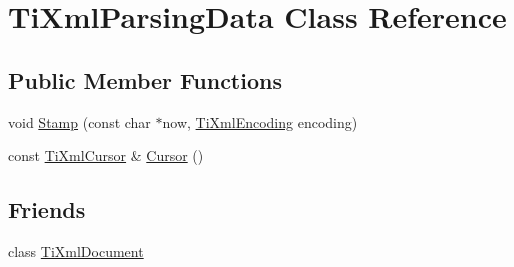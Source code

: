 \hypertarget{class_ti_xml_parsing_data}{\section{Ti\-Xml\-Parsing\-Data Class Reference}
\label{class_ti_xml_parsing_data}
}
\subsection*{Public Member Functions}
\begin{DoxyCompactItemize}
\item 
void \hyperlink{class_ti_xml_parsing_data_a65cee8ab77a36c605db08c84b4c30a7d}{Stamp} (const char $\ast$now, \hyperlink{tinyxml_8h_a88d51847a13ee0f4b4d320d03d2c4d96}{Ti\-Xml\-Encoding} encoding)
\item 
const \hyperlink{struct_ti_xml_cursor}{Ti\-Xml\-Cursor} \& \hyperlink{class_ti_xml_parsing_data_a56908a17d7d7a6b2e511e62cf1d40d05}{Cursor} ()
\end{DoxyCompactItemize}
\subsection*{Friends}
\begin{DoxyCompactItemize}
\item 
class \hyperlink{class_ti_xml_parsing_data_a173617f6dfe902cf484ce5552b950475}{Ti\-Xml\-Document}
\end{DoxyCompactItemize}


